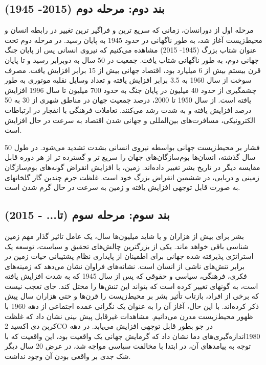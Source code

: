 	\subsection*{بند دوم: مرحله دوم (2015- 1945)}
مرحله اول از دورانسان، زمانی که سریع ترین و فراگیر ترین تغییر در رابطه انسان و  محیط‌زیست آغاز شد، به طور ناگهانی در حدود 1945 به پایان رسید. در مرحله دوم تحت عنوان شتاب بزرگ (1945- 2015) مشاهده می‌کنیم که نیروی انسانی پس از پایان جنگ جهانی دوم، به طور ناگهانی شتاب یافت. جمعیت در 50 سال به دوبرابر رسید و تا پایان قرن بیستم بیش از 6 میلیارد بود، اقتصاد جهانی بیش از 15 برابر افزایش یافت. مصرف سوخت از سال 1960 به 3.5 برابر افزایش یافته و تعداد وسایل نقلیه موتوری به طور چشمگیری از حدود 40 میلیون در پایان جنگ به حدود 700 میلیون تا سال 1996 افزایش یافته است. از سال 1950 تا 2000، درصد جمعیت جهان در مناطق شهری از 30 به 50 درصد افزایش یافته و به شدت رشد می‌کنند. تعاملات فرهنگی با انفجار در ارتباطات الکترونیکی، مسافرت‌های بین‌المللی و جهانی شدن اقتصاد به سرعت در حال افزایش است.

فشار بر  محیط‌زیست جهانی بواسطه نیروی انسانی بشدت تشدید می‌شود. در طول 50 سال گذشته، انسان‌ها 
بوم‌سازگان‌های 
جهان را سریع تر و گسترده تر از هر دوره قابل مقایسه دیگر در تاریخ بشر تغییر داده‌اند. زمین، با افزایش انقراض گونه‌های بوم‌سازگان زمینی و دریایی، در ششمین انقراض بزرگ خود است. غلظت جرم چندین گاز گلخانهای به صورت قابل توجهی افزایش یافته و زمین به سرعت در حال گرم شدن است.

	\subsection*{بند سوم: مرحله سوم (تا... - 2015)}
بشر برای بیش از هزاران و یا شاید میلیون‌ها سال، یک عامل تاثیر گذار مهم زمین شناسی باقی خواهد ماند. یکی از بزرگترین چالش‌های تحقیق و سیاست، توسعه یک استراتژی پذیرفته شده جهانی برای اطمینان از پایداری نظام پشتیبانی حیات زمین در برابر تنش‌های ناشی از انسان است. نشانه‌های فراوان نشان می‌دهد که زمینه‌های فکری، فرهنگی، سیاسی و حقوقی که پس از سال 1945 که به شدت افزایش یافته است، به گونهای تغییر کرده است که بتواند این تنش‌ها را مختل کند. جای تعجب نیست که برخی از افراد، بازتاب تأثیر بشر بر  محیط‌زیست را قرن‌ها و حتی هزاران سال پیش ذکر کرده‌اند. با این حال، آغاز آن را به عنوان یک نگرانی عمده اجتماعی از دهه 1960 با ظهور  محیط‌زیست مدرن می‌دانیم. مشاهدات غیرقابل پیش بینی نشان داد که غلظت کربن دی اکسید 2{CO}
 در جو بطور قابل توجهی افزایش می‌یابد. در دهه 1980‌اندازه‌گیری‌های دما نشان داد که گرمایش جهانی یک واقعیت بود، این واقعیت که با توجه به پیامدهای آن، در ابتدا با مخالفت سیاسی مواجه شد، در عرض 20 سال دیگر شک جدی بر واقعی بودن آن وجود نداشت.
 
